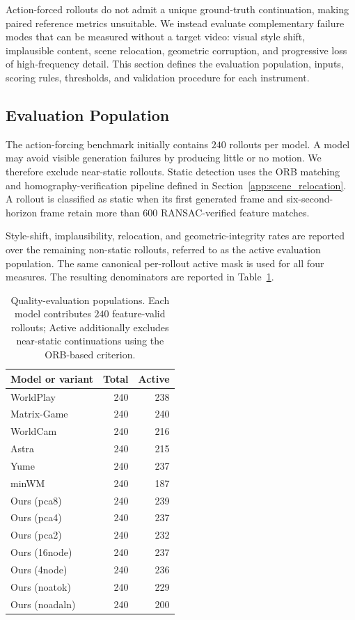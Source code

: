 \documentclass[letterpaper]{article} %
\begin{document}
Action-forced rollouts do not admit a unique ground-truth continuation, making
paired reference metrics unsuitable. We instead evaluate complementary
failure modes that can be measured without a target video: visual style shift,
implausible content, scene relocation, geometric corruption, and progressive
loss of high-frequency detail. This section defines the evaluation population,
inputs, scoring rules, thresholds, and validation procedure for each
instrument.


\subsection{Evaluation Population}
\label{app:quality_population}

The action-forcing benchmark initially contains $240$ rollouts per model. A model may avoid visible generation failures by producing little or no
motion. We therefore exclude near-static rollouts. Static detection uses the
ORB matching and homography-verification pipeline defined in
Section~\ref{app:scene_relocation}. A rollout is classified as static when
its first generated frame and six-second-horizon frame retain more than
$600$ RANSAC-verified feature matches.

Style-shift, implausibility, relocation, and geometric-integrity rates are
reported over the remaining non-static rollouts, referred to as the active
evaluation population. The same canonical per-rollout active mask is used for
all four measures. The resulting denominators are reported in
Table~\ref{tab:quality_denominators}.

\begin{table}[t]
\centering
\small
\caption{
    Quality-evaluation populations. Each model contributes $240$
    feature-valid rollouts; Active additionally excludes near-static
    continuations using the ORB-based criterion.
}
\label{tab:quality_denominators}
\begin{tabular}{lrr}
\toprule
Model or variant & Total & Active \\
\midrule
WorldPlay          & 240 & 238 \\
Matrix-Game        & 240 & 240 \\
WorldCam           & 240 & 216 \\
Astra              & 240 & 215 \\
Yume               & 240 & 237 \\
minWM              & 240 & 187 \\
\midrule
Ours (pca8)        & 240 & 239 \\
Ours (pca4)        & 240 & 237 \\
Ours (pca2)        & 240 & 232 \\
Ours (16node)      & 240 & 237 \\
Ours (4node)       & 240 & 236 \\
Ours (noatok)      & 240 & 229 \\
Ours (noadaln)     & 240 & 200 \\
\bottomrule
\end{tabular}
\end{table}
\end{document}
